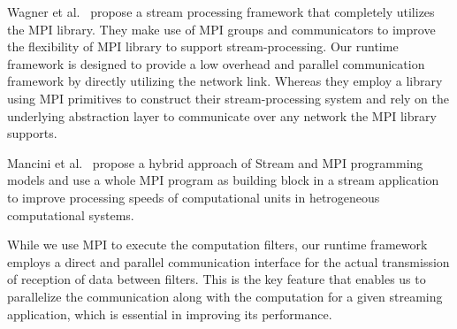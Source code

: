\documentclass[10pt, conference, compsocconf, reqno]{IEEEtran}
\newcommand{\comment}[1]{}
\begin{document}
Wagner et al.~\cite{5160944} propose a stream processing framework that completely utilizes the MPI library. They make use of MPI groups and communicators to improve the flexibility of MPI library to support stream-processing. Our runtime framework is designed to provide a low overhead and parallel communication framework by directly utilizing the network link. Whereas they employ a library using MPI primitives to construct their stream-processing system and rely on the underlying abstraction layer to communicate over any network the MPI library supports.

Mancini et al.~\cite{5493465} propose a hybrid approach of Stream and MPI programming models and use a whole MPI program as building block in a stream application to improve processing speeds of computational units in hetrogeneous computational systems.

While we use MPI to execute the computation filters, our runtime framework employs a direct and parallel communication interface for the actual transmission of reception of data between filters. This is the key feature that enables us to parallelize the communication along with the computation for a given streaming application, which is essential in improving its performance.

\comment{
Several prior researchers \cite{Dobrescu09routebricks:exploiting}\cite{Han:2010:PGS:1851275.1851207}\cite{Wang:2009:PPN:1542275.1542307}\cite{springerlink:10.1007/s11227-011-0579-3} have worked on using commodity multicore processors to perform network operations.

Dobrescu et al.\cite{Dobrescu09routebricks:exploiting} shows the performance improvement achieved in the construction of software routers by distributing related operations over multiple servers.

Han et al. \cite{Han:2010:PGS:1851275.1851207} perform tasks related to high performance packet processing on commodity hardware using GPUs. They have developed a novel framework known as PacketShader that can do packet processing in user space by exploiting the massively-parallel architecture of GPUs.

Wang et al. \cite{Wang:2009:PPN:1542275.1542307} constructs a high performance connection-affinity based lock-free multicore network processing system that claims to achieve multiple Gbps network processing speed for complex tasks.

Egi et al.\cite{springerlink:10.1007/s11227-011-0579-3} shows techniques on parallelizing network operations on multicore architectures by defining principles that consider multiple resources and not just the CPU alone.
}
\end{document}
